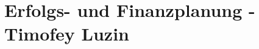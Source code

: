\documentclass[11pt,a4paper]{article}
\begin{document}



\section{Erfolgs- und Finanzplanung - Timofey Luzin}
\label{sec:finanzplanung}
\end{document}
